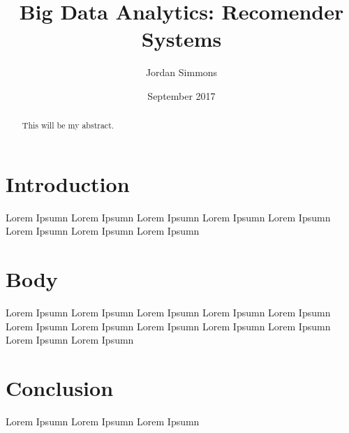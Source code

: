 \documentclass{article}
\title{Big Data Analytics: Recomender Systems}
\author{Jordan Simmons }
\date{September 2017}
\begin{document}
\maketitle
\begin{abstract}
This will be my abstract.
\end{abstract}


\section{Introduction}
Lorem Ipsumn Lorem Ipsumn Lorem Ipsumn Lorem Ipsumn Lorem Ipsumn Lorem Ipsumn Lorem Ipsumn Lorem Ipsumn 



\section{Body}
Lorem Ipsumn Lorem Ipsumn Lorem Ipsumn Lorem Ipsumn Lorem Ipsumn Lorem Ipsumn Lorem Ipsumn Lorem Ipsumn Lorem Ipsumn Lorem Ipsumn Lorem Ipsumn Lorem Ipsumn \citep{test}


\section{Conclusion}
 Lorem Ipsumn Lorem Ipsumn Lorem Ipsumn \citep{citetest}
 




\end{document}
